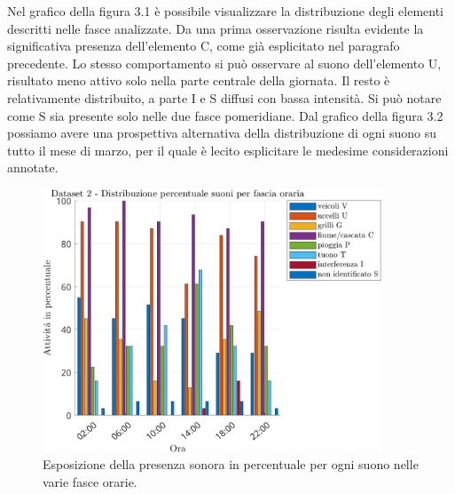 Nel grafico della figura 3.1 è possibile visualizzare la distribuzione degli elementi descritti nelle fasce
analizzate. Da una prima osservazione risulta evidente la significativa presenza dell’elemento
C, come già esplicitato nel paragrafo precedente. Lo stesso comportamento si può osservare
al suono dell’elemento U, risultato meno attivo solo nella parte centrale della giornata. Il
resto è relativamente distribuito, a parte I e S diffusi con bassa intensità. Si può notare come
S sia presente solo nelle due fasce pomeridiane. Dal grafico della figura 3.2 possiamo avere una
prospettiva alternativa della distribuzione di ogni suono su tutto il mese di marzo, per il quale
è lecito esplicitare le medesime considerazioni annotate.

\hfill
\begin{center}	
\begin{figure}[htp]
	\centering
	\includegraphics[width=0.9\textwidth]{img/cap3-dataset1.jpg}
	\caption{Esposizione della presenza sonora in percentuale per ogni suono nelle varie fasce orarie.}
	\label{fig3.1}
\end{figure}
\end{center}
